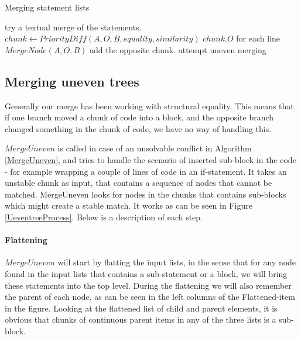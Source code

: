 \documentclass[11pt]{article}
\begin{document}
\begin{algorithm}
  \caption{Merging statement lists}
  \label{MergeStatementList}
\begin{algorithmic}
    \State try  a textual merge of the statements.
        \State $chunk \gets PriorityDiff(A, O, B, equality, similarity)$
                \State \Return $chunk.O$
                \State for each line \Return $MergeNode(A, O, B)$
                \State add the opposite chunk.
            \Else
                \State attempt uneven merging
            \EndIf
        \EndFor
    \EndIf
\EndFunction
\end{algorithmic}
\end{algorithm}

\subsection{Merging uneven trees}
Generally our merge has been working with structural equality. This means that if one branch moved a chunk of code into a block, and the opposite branch changed something in the chunk of code, we have no way of handling this.

$MergeUneven$ is called in case of an unsolvable conflict in Algorithm \ref{MergeUneven}, and tries to handle the scenario of inserted sub-block in the code - for example wrapping a couple of lines of code in an if-statement. It takes an unstable chunk as input, that contains a sequence of nodes that cannot be matched. MergeUneven looks for nodes in the chunks that contains sub-blocks which might create a stable match. It works as can be seen in Figure \ref{UeventreeProcess}. Below is a description of each step.

\paragraph{Flattening} $MergeUneven$ will start by flatting the input lists, in the sense that for any node found in the input lists that contains a sub-statement or a block, we will bring these statements into the top level. During the flattening we will also remember the parent of each node, as can be seen in the left columns of the Flattened-item in the figure. Looking at the flattened list of child and parent elements,  it is obvious that chunks of continuous parent items in any of the three lists is a sub-block.
\end{document}
